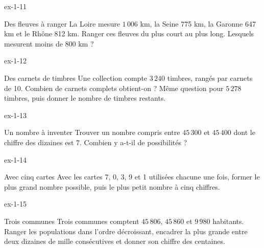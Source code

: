 \begin{blocLivre}{ex-1-11}\begin{exercice}[3]{Des fleuves à ranger}
La Loire mesure $1\,006$ km, la Seine 775 km, la Garonne 647 km et le Rhône 812 km. Ranger ces fleuves du plus court au plus long. Lesquels mesurent moins de 800 km ?
\end{exercice}\end{blocLivre}
\begin{blocLivre}{ex-1-12}\begin{exercice}[3]{Des carnets de timbres}
Une collection compte $3\,240$ timbres, rangés par carnets de 10. Combien de carnets complets obtient-on ? Même question pour $5\,278$ timbres, puis donner le nombre de timbres restants.
\end{exercice}\end{blocLivre}
\begin{blocLivre}{ex-1-13}\begin{exercice}[3]{Un nombre à inventer}
Trouver un nombre compris entre $45\,300$ et $45\,400$ dont le chiffre des dizaines est 7. Combien y a-t-il de possibilités ?
\end{exercice}\end{blocLivre}
\begin{blocLivre}{ex-1-14}\begin{exercice}[3]{Avec cinq cartes}
Avec les cartes 7, 0, 3, 9 et 1 utilisées chacune une fois, former le plus grand nombre possible, puis le plus petit nombre à cinq chiffres.
\end{exercice}\end{blocLivre}
\begin{blocLivre}{ex-1-15}\begin{exercice}[3]{Trois communes}
Trois communes comptent $45\,806$, $45\,860$ et $9\,980$ habitants. Ranger les populations dans l’ordre décroissant, encadrer la plus grande entre deux dizaines de mille consécutives et donner son chiffre des centaines.
\end{exercice}\end{blocLivre}

\clearpage
